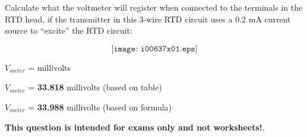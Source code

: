 

Calculate what the voltmeter will register when connected to the terminals in the RTD head, if the transmitter in this 3-wire RTD circuit uses a 0.2 mA current source to ``excite'' the RTD circuit:

$$\texttt{[image: i00637x01.eps]}$$

$V_{meter}$ = \underbar{\hskip 50pt} millivolts







$V_{meter}$ = {\bf 33.818} millivolts (based on table)

\vskip 10pt

$V_{meter}$ = {\bf 33.988} millivolts (based on formula)







{\bf This question is intended for exams only and not worksheets!}.


